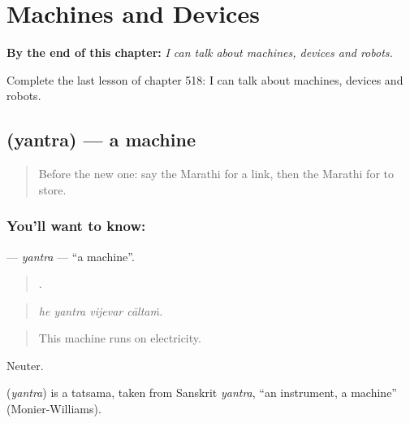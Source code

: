 
\chapter{Machines and Devices}
\label{ch:mr-machines-and-devices}

\begin{chapteropening}
\textbf{By the end of this chapter:} \emph{I can talk about machines, devices and robots.}

Complete the last lesson of chapter 518: I can talk about machines, devices and robots.
\end{chapteropening}

\section[\texorpdfstring{\mr{यंत्र} (yantra)}{यंत्र (yantra)}]{ (yantra) — a machine}

\label{lesson:MR-C518-yantra}



\begin{quote}
Before the new one: say the Marathi for a link, then the Marathi for to store.
\end{quote}

\subsection*{You'll want to know: }
\textbf{} — \emph{yantra} — \textquotedblleft{}a machine\textquotedblright{}.

\begin{quote}
   .
\end{quote}

\begin{quote}
\emph{he yantra vijevar cāltaṁ.}
\end{quote}

\begin{quote}
This machine runs on electricity.
\end{quote}

Neuter.

\begin{cousinweb}
\textbf{} (\emph{yantra}) is a tatsama, taken from Sanskrit \emph{yantra}, \textquotedblleft{}an instrument, a machine\textquotedblright{} (Monier-Williams).
\end{cousinweb}

